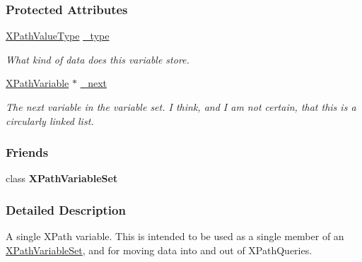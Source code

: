 \subsubsection*{Protected Attributes}
\begin{DoxyCompactItemize}
\item 
\hypertarget{classphys_1_1xml_1_1XPathVariable_a8841d47677912f4b88743928cf931eac}{
\hyperlink{namespacephys_1_1xml_a339b9eef674ba44100110e5524bc575d}{XPathValueType} \hyperlink{classphys_1_1xml_1_1XPathVariable_a8841d47677912f4b88743928cf931eac}{\_\-type}}
\label{df/dee/classphys_1_1xml_1_1XPathVariable_a8841d47677912f4b88743928cf931eac}

\begin{DoxyCompactList}\small\item\em What kind of data does this variable store. \item\end{DoxyCompactList}\item 
\hypertarget{classphys_1_1xml_1_1XPathVariable_abe57b58f8b6d2622d5e1ae93bc5361a3}{
\hyperlink{classphys_1_1xml_1_1XPathVariable}{XPathVariable} $\ast$ \hyperlink{classphys_1_1xml_1_1XPathVariable_abe57b58f8b6d2622d5e1ae93bc5361a3}{\_\-next}}
\label{df/dee/classphys_1_1xml_1_1XPathVariable_abe57b58f8b6d2622d5e1ae93bc5361a3}

\begin{DoxyCompactList}\small\item\em The next variable in the variable set. I think, and I am not certain, that this is a circularly linked list. \item\end{DoxyCompactList}\end{DoxyCompactItemize}
\subsubsection*{Friends}
\begin{DoxyCompactItemize}
\item 
\hypertarget{classphys_1_1xml_1_1XPathVariable_a6d8e28205e67fa0164160dd3cb547fe6}{
class {\bfseries XPathVariableSet}}
\label{df/dee/classphys_1_1xml_1_1XPathVariable_a6d8e28205e67fa0164160dd3cb547fe6}

\end{DoxyCompactItemize}


\subsubsection{Detailed Description}
A single XPath variable. This is intended to be used as a single member of an \hyperlink{classphys_1_1xml_1_1XPathVariableSet}{XPathVariableSet}, and for moving data into and out of XPathQueries. 

